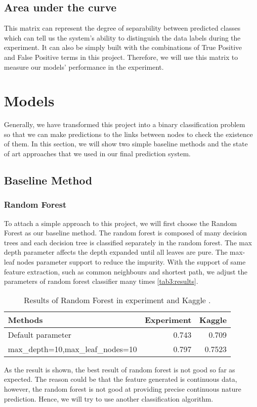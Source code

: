 \documentclass[a4paper,11pt]{article}
\begin{document}
\subsection{Area under the curve}
This matrix can represent the degree of separability between predicted classes which can tell us the system’s ability to distinguish the data labels during the experiment. It can also be simply built with the combinations of True Positive and False Positive terms in this project. Therefore, we will use this matrix to measure our models' performance in the experiment.


\section{Models}
Generally, we have transformed this project into a binary classification problem so that we can make predictions to the links between nodes to check the existence of them. In this section, we will show two simple baseline methods and the state of art approaches that we used in our final prediction system.

\subsection{Baseline Method}
\subsubsection{Random Forest}
To attach a simple approach to this project, we will first choose the Random Forest as our baseline method. The random forest is composed of many decision trees and each decision tree is classified separately in the random forest. The max depth parameter affects the depth expanded until all leaves are pure. The max-leaf nodes parameter support to reduce the impurity. With the support of same feature extraction, such as common neighbours and shortest path, we adjust the parameters of random forest classifier many times \autoref{tab3:results}.

\begin{table}[h]
  \centering
  \begin{tabular}{lrr}
    \toprule
    Methods & Experiment & Kaggle \\
    \midrule
    Default parameter  & 0.743& 0.709 \\
    max_depth=10,max_leaf_nodes=10 & 0.797 & 0.7523 \\
    \bottomrule
  \end{tabular}
  \caption{Results of Random Forest in experiment and Kaggle .}\label{tab3:results}
\end{table}
As the result is shown, the best result of random forest is not good so far as expected. The reason could be that the feature generated is continuous data, however, the random forest is not good at providing precise continuous nature prediction. Hence, we will try to use another classification algorithm.
\end{document}
